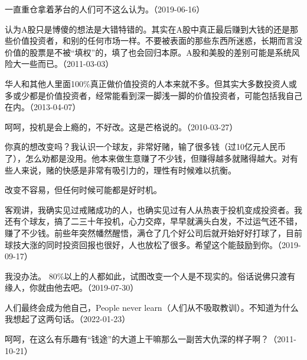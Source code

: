 
一直重仓拿着茅台的人们可不这么认为。（2019-06-16）

认为A股只是博傻的想法是大错特错的。其实在A股中真正最后赚到大钱的还是那些价值投资者，和别的任何市场一样。不要被表面的那些东西所迷惑，长期而言没价值的股票是不被“填权”的，填了也会回归本原。A股和美股的差别可能是系统风险大一些而已。（2011-03-03）

华人和其他人里面100\%真正做价值投资的人本来就不多。但其实大多数投资人或多或少都是价值投资者，经常能看到深一脚浅一脚的价值投资者，可能包括我自己在内。（2013-04-07）


呵呵，投机是会上瘾的，不好改。这是芒格说的。（2010-03-27）


你真的想改变吗？我认识一个球友，非常好赌，输了很多钱（过10亿元人民币了），怎么劝都是没用。他本来做生意赚了不少钱，但赚得越多就赌得越大。对有些人来说，赌的快感是非常有吸引力的，理性有时候难以抗衡。

改变不容易，但任何时候可能都是好时机。

客观讲，我确实见过戒赌成功的人，也确实见过有人从热衷于投机变成投资者。我还有个球友，搞了二三十年投机，心力交瘁，早早就满头白发，不过运气还不错，赚了不少钱。前些年突然幡然醒悟，满仓了几个好公司后就开始好好打球了，目前球技大涨的同时投资回报也很好，人也放松了很多。希望这个能鼓励到你。（2019-09-17）


我没办法。 80\%以上的人都如此，试图改变一个人是不现实的。俗话说佛只渡有缘人，你就由他去吧。（2019-07-30）


人们最终会成为他自己，People never learn（人们从不吸取教训）。不知道为什么我想起了这两句话。（2022-01-23）


呵呵，在这么有乐趣有“钱途”的大道上干嘛那么一副苦大仇深的样子啊？（2011-10-21）

